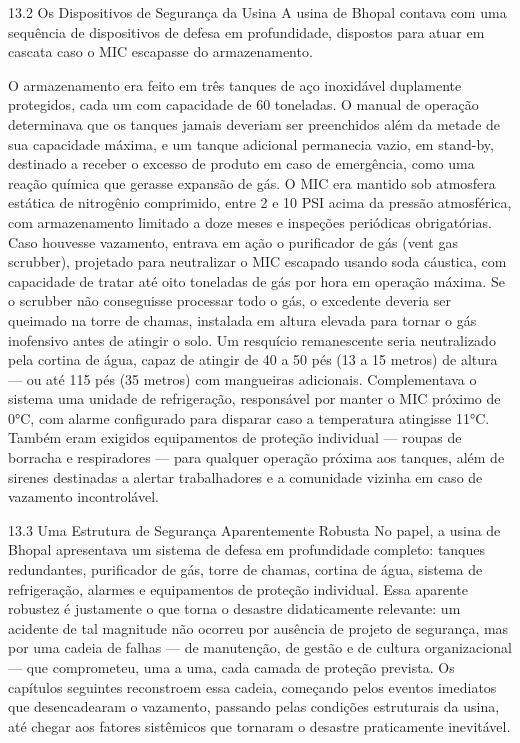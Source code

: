 13.2 Os Dispositivos de Segurança da Usina A usina de Bhopal contava com uma sequência de dispositivos de defesa em profundidade, dispostos para atuar em cascata caso o MIC escapasse do armazenamento.

O armazenamento era feito em três tanques de aço inoxidável duplamente protegidos, cada um com capacidade de 60 toneladas. O manual de operação determinava que os tanques jamais deveriam ser preenchidos além da metade de sua capacidade máxima, e um tanque adicional permanecia vazio, em stand-by, destinado a receber o excesso de produto em caso de emergência, como uma reação química que gerasse expansão de gás. O MIC era mantido sob atmosfera estática de nitrogênio comprimido, entre 2 e 10 PSI acima da pressão atmosférica, com armazenamento limitado a doze meses e inspeções periódicas obrigatórias. Caso houvesse vazamento, entrava em ação o purificador de gás (vent gas scrubber), projetado para neutralizar o MIC escapado usando soda cáustica, com capacidade de tratar até oito toneladas de gás por hora em operação máxima. Se o scrubber não conseguisse processar todo o gás, o excedente deveria ser queimado na torre de chamas, instalada em altura elevada para tornar o gás inofensivo antes de atingir o solo. Um resquício remanescente seria neutralizado pela cortina de água, capaz de atingir de 40 a 50 pés (13 a 15 metros) de altura — ou até 115 pés (35 metros) com mangueiras adicionais. Complementava o sistema uma unidade de refrigeração, responsável por manter o MIC próximo de 0°C, com alarme configurado para disparar caso a temperatura atingisse 11°C. Também eram exigidos equipamentos de proteção individual — roupas de borracha e respiradores — para qualquer operação próxima aos tanques, além de sirenes destinadas a alertar trabalhadores e a comunidade vizinha em caso de vazamento incontrolável.

13.3 Uma Estrutura de Segurança Aparentemente Robusta No papel, a usina de Bhopal apresentava um sistema de defesa em profundidade completo: tanques redundantes, purificador de gás, torre de chamas, cortina de água, sistema de refrigeração, alarmes e equipamentos de proteção individual. Essa aparente robustez é justamente o que torna o desastre didaticamente relevante: um acidente de tal magnitude não ocorreu por ausência de projeto de segurança, mas por uma cadeia de falhas — de manutenção, de gestão e de cultura organizacional — que comprometeu, uma a uma, cada camada de proteção prevista. Os capítulos seguintes reconstroem essa cadeia, começando pelos eventos imediatos que desencadearam o vazamento, passando pelas condições estruturais da usina, até chegar aos fatores sistêmicos que tornaram o desastre praticamente inevitável.

